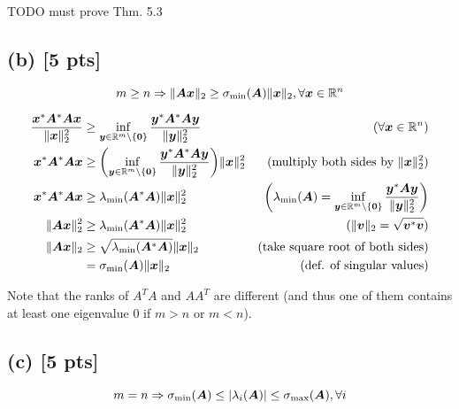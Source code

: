 \documentclass[twoside,10pt]{article}
\begin{document}
TODO must prove Thm. 5.3

\subsection*{(b) [5 pts]}
  \begin{equation*}
    m \geq n \Rightarrow \|\mtx{A}\vct{x}\|_2 \geq \sigma_{\mathrm{min}}\left(\mtx{A}\right) \|\vct{x}\|_2, \forall \vct{x} \in \R^n
  \end{equation*}

\begin{align*}
  \dfrac{\vct{x}^{*}\mtx{A}^{*}\mtx{A}\vct{x}}{\|\vct{x}\|_2^2} &\geq\inf \limits_{\vct{y} \in \R^m \setminus \{\vct{0}\}} \dfrac{\vct{y}^{*} \mtx{A}^{*}\mtx{A}\vct{y}}{\|\vct{y}\|_2^2} &\text{($\forall\vct{x} \in \R^n$)}\\
  \vct{x}^{*}\mtx{A}^{*}\mtx{A}\vct{x} &\geq \left(\inf \limits_{\vct{y} \in \R^m \setminus \{\vct{0}\}} \dfrac{\vct{y}^{*} \mtx{A}^{*}\mtx{A}\vct{y}}{\|\vct{y}\|_2^2}\right) \|\vct{x}\|_2^2  &\text{(multiply both sides by $\|\vct{x}\|_2^2$)}\\
  \vct{x}^{*}\mtx{A}^{*}\mtx{A}\vct{x} &\geq \lambda_{\mathrm{min}}(\mtx{A}^{*}\mtx{A}) \|\vct{x}\|_2^2 &\text{$\left(\lambda_{\mathrm{min}}\left(\mtx{A}\right) = \inf \limits_{\vct{y} \in \R^m \setminus \{\vct{0}\}} \dfrac{\vct{y}^{*} \mtx{A}\vct{y}}{\|\vct{y}\|_2^2}\right)$}\\
  \|\mtx{A}\vct{x}\|_2^2 &\geq \lambda_{\mathrm{min}}(\mtx{A}^{*}\mtx{A}) \|\vct{x}\|_2^2 &\text{($\|\vct{v}\|_2 = \sqrt{\vct{v}^{*}\vct{v}}$)}\\
  \|\mtx{A}\vct{x}\|_2 &\geq \sqrt{\lambda_{\mathrm{min}}(\mtx{A}^{*}\mtx{A})} \|\vct{x}\|_2 &\text{(take square root of both sides)}\\
  &=\sigma_{\mathrm{min}}\left(\mtx{A}\right) \|\vct{x}\|_2 &\text{(def. of singular values)}\\
\end{align*}

  Note that the ranks of $A^TA$ and $AA^T$ are different (and thus one of them contains at least one eigenvalue $0$ if $m > n$ or $m < n$).

\subsection*{(c) [5 pts]}
  \begin{equation*}
    m = n \Rightarrow \sigma_{\mathrm{min}}(\mtx{A}) \leq \left|\lambda_{i}\left(\mtx{A}\right)\right| \leq \sigma_{\mathrm{max}}\left(\mtx{A}\right), \forall i 
  \end{equation*}
\end{document}
